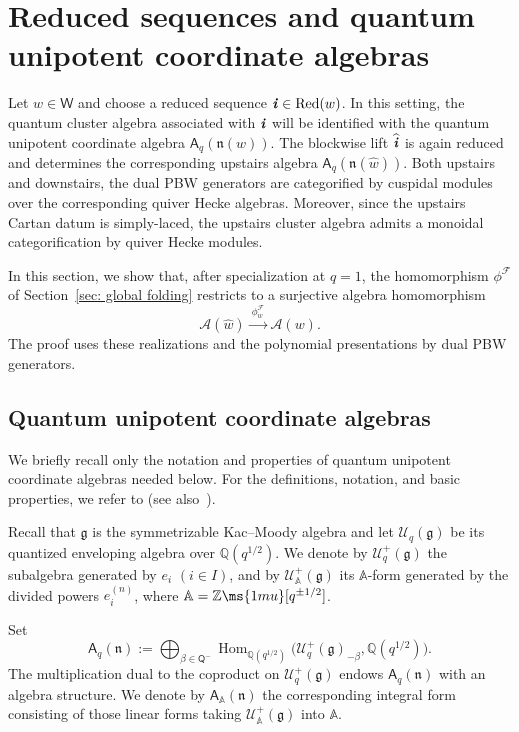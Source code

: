 \documentclass[12pt, leqno]{amsart}
\numberwithin{equation}{section}
\theoremstyle{plain}
\theoremstyle{definition}
\newcommand{\seteq}{\mathbin{:=}}
\newcommand{\g}{\mathfrak{g}}
\newcommand{\n}{\mathfrak{n}}
\newcommand{\Q}{\mathbb{Q}}
\newcommand{\Z}{\mathbb{Z}\ms{1mu}}
\newcommand{\ii}{ \textbf{\textit{i}}}
\newcommand{\Hom}{\operatorname{Hom}}
\newcommand{\hw}{\widehat{w}}
\newcommand{\hii}{{\widehat{\ii}}}
\newcommand{\sfA}{\mathsf{A}}
\newcommand{\sfQ}{\mathsf{Q}}
\newcommand{\sfW}{\mathsf{W}}
\newcommand{\bbA}{\mathbb{A}}
\newcommand{\calA}{\mathcal{A}}
\newcommand{\calF}{\mathcal{F}}
\newcommand{\calU}{\mathcal{U}}
\newcommand{\weyl}{\sfW}
\newcommand{\Red}{\mathrm{Red}}
\begin{document}
\section{Reduced sequences and quantum unipotent coordinate algebras}
\label{sec: reduced}

Let $w\in\weyl$ and choose a reduced sequence
$\ii\in\Red(w)$.  In this setting, the quantum cluster algebra
associated with $\ii$ will be identified with the quantum unipotent
coordinate algebra $\sfA_q(\n(w))$.   The blockwise lift $\hii$ is
again reduced{} and determines the corresponding upstairs algebra
$\sfA_q(\n(\hw))$.  Both upstairs and downstairs, the dual
PBW generators are categorified by cuspidal modules over the
corresponding quiver Hecke algebras. Moreover, since the upstairs
Cartan datum is simply-laced, the upstairs cluster algebra admits a
monoidal categorification by quiver Hecke modules.

In this section, we show that, after specialization at $q=1$, the
 homomorphism $\phi^\calF$ of
Section~\ref{sec: global folding}{} restricts to a surjective algebra
homomorphism
\[
\calA(\hw)\xrightarrow{\ \phi^\calF_w\ }\calA(w).
\]
The proof uses these realizations and the polynomial
presentations by dual PBW generators.

\subsection{Quantum unipotent coordinate algebras}

We briefly recall only the notation and properties of quantum
unipotent coordinate algebras needed below.  For the definitions,
notation, and basic properties, we refer to \cite{Kimura12}
(see also~\cite{KKKO18,FHOO}).

\smallskip

Recall that $\g$ is the symmetrizable Kac--Moody algebra and let $\calU_q(\g)$ be its quantized enveloping
algebra over $\Q(q^{1/2})$.  We denote by $\calU_q^+(\g)$ the subalgebra generated by
$e_i$ $(i\in I)$, and by $\calU_\bbA^+(\g)$ its $\bbA$-form generated by
the divided powers $e_i^{(n)}$, where $\bbA = \Z[q^{\pm1/2}]$.

Set
\[
\sfA_q(\n) \seteq  \bigoplus_{\beta\in \sfQ^-}   \Hom_{\Q(q^{1/2})}\bigl(\calU_q^+(\g)_{-\beta},\Q(q^{1/2})\bigr).
\]
The multiplication dual to the coproduct on $\calU_q^+(\g)$ endows
$\sfA_q(\n)$ with an algebra structure.  We denote by
$\sfA_\bbA(\n)$ the corresponding integral form consisting
of those linear forms taking $\calU_\bbA^+(\g)$ into $\bbA$.
\end{document}
